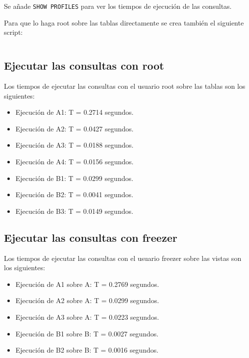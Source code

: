 \documentclass[a4paper, 11pt, oneside]{article} %
\newcommand{\scriptdir}{../scripts/} %
\begin{document}
\inputminted{mysql}{\scriptdir scripts/scripts_consulta_privilegios/freezer_queries.sql}

Se añade \texttt{SHOW PROFILES} para ver los tiempos de ejecución de las consultas.

Para que lo haga root sobre las tablas directamente se crea también el siguiente script:

\inputminted{mysql}{\scriptdir scripts/scripts_consulta_privilegios/root_queries.sql}

\subsection{Ejecutar las consultas con root}

Los tiempos de ejecutar las consultas con el usuario root sobre las tablas son los siguientes:

\begin{itemize}
	\item Ejecución de A1: T = 0.2714 segundos.
	\item Ejecución de A2: T = 0.0427 segundos.
	\item Ejecución de A3: T = 0.0188 segundos.
	\item Ejecución de A4: T = 0.0156 segundos.
	\item Ejecución de B1: T = 0.0299 segundos.
	\item Ejecución de B2: T = 0.0041 segundos.
	\item Ejecución de B3: T = 0.0149 segundos.
\end{itemize}

\subsection{Ejecutar las consultas con freezer}

Los tiempos de ejecutar las consultas con el usuario freezer sobre las vistas son los siguientes:

\begin{itemize}
	\item Ejecución de A1 sobre A: T = 0.2769 segundos.
	\item Ejecución de A2 sobre A: T = 0.0299 segundos.
	\item Ejecución de A3 sobre A: T = 0.0223 segundos.
	\item Ejecución de B1 sobre B: T = 0.0027 segundos.
	\item Ejecución de B2 sobre B: T = 0.0016 segundos.
\end{itemize}
\end{document}
